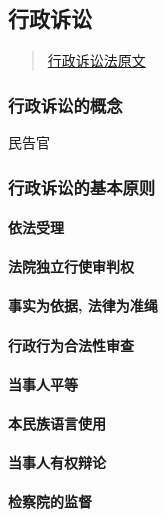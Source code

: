 \subsection{行政诉讼}

\begin{quote}
    \href{https://www.gov.cn/flfg/2006-10/29/content_1499268.htm}{行政诉讼法原文}
\end{quote}

\subsubsection{行政诉讼的概念} 民告官

\subsubsection{行政诉讼的基本原则} 

\paragraph{依法受理}

\paragraph{法院独立行使审判权}

\paragraph{事实为依据, 法律为准绳}

\paragraph{行政行为合法性审查}

\paragraph{当事人平等}

\paragraph{本民族语言使用}

\paragraph{当事人有权辩论}

\paragraph{检察院的监督}

